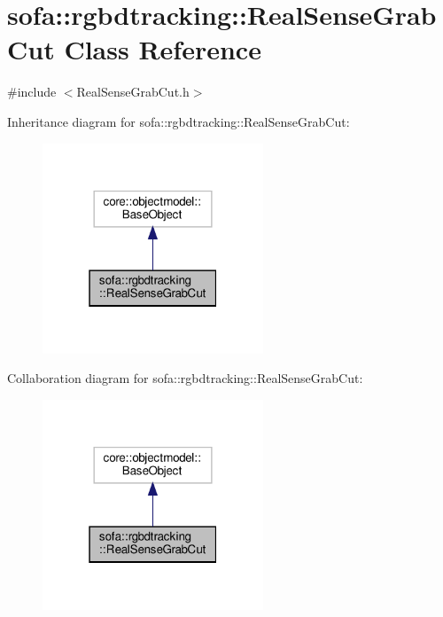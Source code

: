 \hypertarget{classsofa_1_1rgbdtracking_1_1_real_sense_grab_cut}{}\section{sofa\+:\+:rgbdtracking\+:\+:Real\+Sense\+Grab\+Cut Class Reference}
\label{classsofa_1_1rgbdtracking_1_1_real_sense_grab_cut}


{\ttfamily \#include $<$Real\+Sense\+Grab\+Cut.\+h$>$}



Inheritance diagram for sofa\+:\+:rgbdtracking\+:\+:Real\+Sense\+Grab\+Cut\+:
\nopagebreak
\begin{figure}[H]
\begin{center}
\leavevmode
\includegraphics[width=187pt]{classsofa_1_1rgbdtracking_1_1_real_sense_grab_cut__inherit__graph}
\end{center}
\end{figure}


Collaboration diagram for sofa\+:\+:rgbdtracking\+:\+:Real\+Sense\+Grab\+Cut\+:
\nopagebreak
\begin{figure}[H]
\begin{center}
\leavevmode
\includegraphics[width=187pt]{classsofa_1_1rgbdtracking_1_1_real_sense_grab_cut__coll__graph}
\end{center}
\end{figure}
